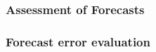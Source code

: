 \subsubsection{Assessment of Forecasts}

\subsubsection{Forecast error evaluation}




 




%
%
%
%
%
%



